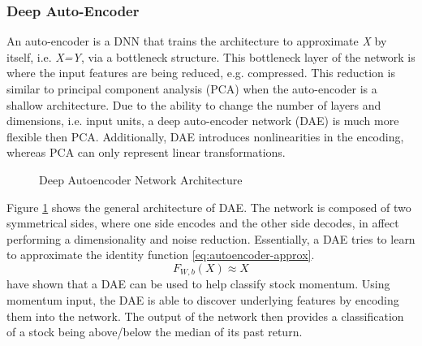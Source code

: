 \documentclass[11pt]{article}
\begin{document}
\subsubsection{Deep Auto-Encoder} \label{sec:autoencoder}
An auto-encoder is a DNN that trains the architecture to approximate \textit{X} by itself, i.e. \textit{X=Y}, via a bottleneck structure. This bottleneck layer of the network is where the input features are being reduced, e.g. compressed. This reduction is similar to principal component analysis (PCA) when the auto-encoder is a shallow architecture. Due to the ability to change the number of layers and dimensions, i.e. input units, a deep auto-encoder network (DAE) is much more flexible then PCA. Additionally, DAE introduces nonlinearities in the encoding, whereas PCA can only represent linear transformations.
\begin{figure}[!ht]
	\centering
	\caption{Deep Autoencoder Network Architecture}
	\label{fig:deep-autoencoder-network}
\end{figure}

Figure \ref{fig:deep-autoencoder-network} shows the general architecture of DAE. The network is composed of two symmetrical sides, where one side encodes and the other side decodes, in affect performing a dimensionality and noise reduction. Essentially, a DAE tries to learn to approximate the identity function \ref{eq:autoencoder-approx}.
\begin{equation}
\label{eq:autoencoder-approx}
F_{W,b}\left(X\right) \approx X
\end{equation}
\citet{Takeuchi2013ApplyingStocks} have shown that a DAE can be used to help classify stock momentum. Using momentum input, the DAE is able to discover underlying features by encoding them into the network. The output of the network then provides a classification of a stock being above/below the median of its past return.
\end{document}
